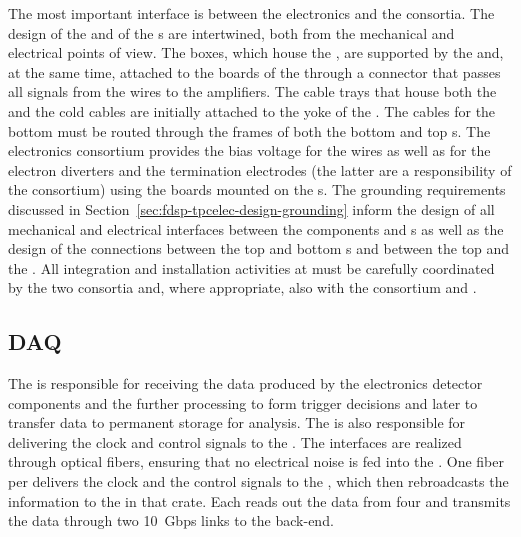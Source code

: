 The most important interface is between the  electronics
and the  consortia. The design of the 
and of the s are intertwined, both from the
mechanical and electrical points of view. The 
boxes, which house the , are supported by the 
and, at the same time, attached to the  boards of the 
through a connector that passes all signals from the wires to
the  amplifiers. The cable trays that house both the
 and the  cold cables are initially
attached to the yoke of the . The 
cables for the bottom  must be routed through the 
frames of both the bottom and top s. The  electronics
consortium provides the bias voltage for the 
wires as well as for the electron diverters and the  termination electrodes (the latter are a responsibility of
the  consortium) using the  boards mounted
on the s. The grounding requirements discussed in
Section~\ref{sec:fdsp-tpcelec-design-grounding} inform the
design of all mechanical and electrical interfaces between
the  components and s as well as the
design of the connections between the top and bottom s
and between the top  and the . All 
integration and installation activities at 
must be carefully coordinated by the two consortia and, 
where appropriate, also with the  consortium 
and .

\subsection{DAQ}
\label{sec:fdsp-tpcelec-interfaces-daq}

The  is responsible for receiving the data produced by the
 electronics detector components and the further processing to
form trigger decisions and later to transfer data to 
permanent storage for analysis. The 
 is also responsible for delivering the clock and control
signals to the . The interfaces are realized 
through optical fibers, ensuring that no electrical noise is fed into
the . One fiber per  delivers the
clock and the control signals to the , which then
rebroadcasts the information to the  in that 
crate. Each  reads out the data from four 
and transmits the data through two \SI{10}{Gbps} links to the  back-end.

